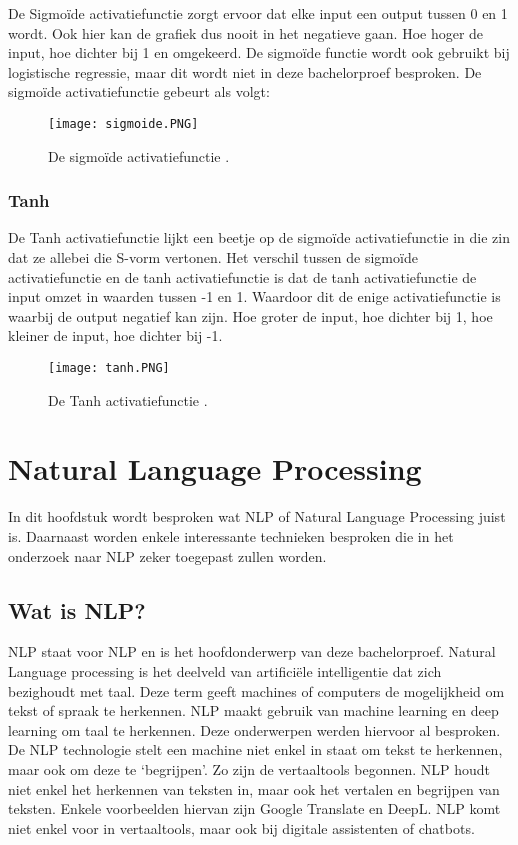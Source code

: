 De \gls{Sigmoïde} activatiefunctie zorgt ervoor dat elke input een output tussen 0 en 1 wordt. Ook hier kan de grafiek dus nooit in het negatieve gaan. Hoe hoger de input, hoe dichter bij 1 en omgekeerd. De sigmoïde functie wordt ook gebruikt bij logistische regressie, maar dit wordt niet in deze bachelorproef besproken. \autocite{Brownlee2021} De sigmoïde activatiefunctie gebeurt als volgt:

\begin{figure}[!htbp]
    \texttt{[image: sigmoide.PNG]}
    \caption{\label{sigmoide}De sigmoïde activatiefunctie \autocite{Brownlee2021}.}
\end{figure}
\FloatBarrier


\subsubsection{Tanh}
\label{sec:tanh}

De \gls{Tanh} activatiefunctie lijkt een beetje op de sigmoïde activatiefunctie in die zin dat ze allebei die S-vorm vertonen. Het verschil tussen de sigmoïde activatiefunctie en de tanh activatiefunctie is dat de tanh activatiefunctie de input omzet in waarden tussen -1 en 1. Waardoor dit de enige activatiefunctie is waarbij de output negatief kan zijn. Hoe groter de input, hoe dichter bij 1, hoe kleiner de input, hoe dichter bij -1. \autocite{Brownlee2021}

\begin{figure}[!htbp]
    \texttt{[image: tanh.PNG]}
    \caption{\label{tanh}De Tanh activatiefunctie \autocite{Brownlee2021}.}
\end{figure}
\FloatBarrier


\section{Natural Language Processing}
\label{sec:NLP}

In dit hoofdstuk wordt besproken wat NLP of Natural Language Processing juist is. Daarnaast worden enkele interessante technieken besproken die in het onderzoek naar NLP zeker toegepast zullen worden. 

\subsection{Wat is NLP?}
\label{sec:WatisNLP}
NLP staat voor \gls{NLP} en is het hoofdonderwerp van deze bachelorproef. Natural Language processing is het deelveld van artificiële intelligentie dat zich bezighoudt met taal. Deze term geeft machines of computers de mogelijkheid om tekst of spraak te herkennen. NLP maakt gebruik van machine learning en deep learning om taal te herkennen. Deze onderwerpen werden hiervoor al besproken. De NLP technologie stelt een machine niet enkel in staat om tekst te herkennen, maar ook om deze te ‘begrijpen’. Zo zijn de vertaaltools begonnen. NLP houdt niet enkel het herkennen van teksten in, maar ook het vertalen en begrijpen van teksten. Enkele voorbeelden hiervan zijn Google Translate en DeepL. NLP komt niet enkel voor in vertaaltools, maar ook bij digitale assistenten of chatbots. \autocite{IBM2020}

